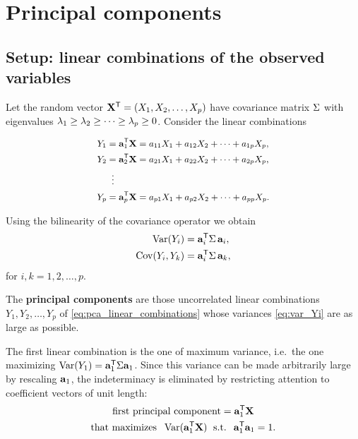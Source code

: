 \section{Principal components}
\label{sec:pca}

\subsection{Setup: linear combinations of the observed variables}
\label{subsec:pca_setup}

Let the random vector $\mathbf{X}^{\mathsf{T}}=(X_1,X_2,\dots,X_p)$ have covariance matrix
$\Sigma$ with eigenvalues $\lambda_1\ge\lambda_2\ge\dots\ge\lambda_p\ge 0$. Consider the linear
combinations

\begin{equation}
  \label{eq:pca_linear_combinations}
  \small
  \begin{aligned}
    Y_1 &= \mathbf{a}_1^{\mathsf{T}}\mathbf{X} = a_{11}X_1 + a_{12}X_2 + \dots + a_{1p}X_p,\\
    Y_2 &= \mathbf{a}_2^{\mathsf{T}}\mathbf{X} = a_{21}X_1 + a_{22}X_2 + \dots + a_{2p}X_p,\\
        &\;\;\vdots\\
    Y_p &= \mathbf{a}_p^{\mathsf{T}}\mathbf{X} = a_{p1}X_1 + a_{p2}X_2 + \dots + a_{pp}X_p.
  \end{aligned}
\end{equation}

Using the bilinearity of the covariance operator we obtain
\begin{align}
  \operatorname{Var}(Y_i)     &= \mathbf{a}_i^{\mathsf{T}}\Sigma\,\mathbf{a}_i,
  \label{eq:var_Yi}\\
  \operatorname{Cov}(Y_i,Y_k) &= \mathbf{a}_i^{\mathsf{T}}\Sigma\,\mathbf{a}_k,
  \label{eq:cov_YiYk}
\end{align}
for $i,k=1,2,\dots,p$.

\begin{definition}
  The \textbf{principal components} are those uncorrelated linear combinations
  $Y_1,Y_2,\dots,Y_p$ of \eqref{eq:pca_linear_combinations} whose variances
  \eqref{eq:var_Yi} are as large as possible.
\end{definition}

The first linear combination is the one of maximum variance, i.e.\ the one
maximizing $\operatorname{Var}(Y_1)=\mathbf{a}_1^{\mathsf{T}}\Sigma\mathbf{a}_1$. Since this variance can be made
arbitrarily large by rescaling $\mathbf{a}_1$, the indeterminacy is eliminated by
restricting attention to coefficient vectors of unit length:
\begin{equation}
  \label{eq:first_pc_problem}
  \begin{gathered}
    \text{first principal component}=\mathbf{a}_1^{\mathsf{T}}\mathbf{X}\\
    \text{that maximizes }\;\operatorname{Var}(\mathbf{a}_1^{\mathsf{T}}\mathbf{X})
    \;\text{ s.t. }\;\mathbf{a}_1^{\mathsf{T}}\mathbf{a}_1=1.
  \end{gathered}
\end{equation}

